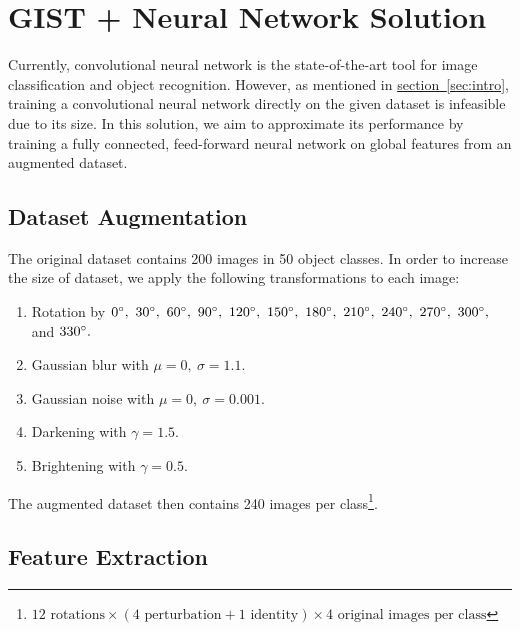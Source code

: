 \documentclass[11pt,a4paper]{article}
\begin{document}
\section{GIST + Neural Network Solution}

Currently, convolutional neural network is the state-of-the-art tool for image classification and object recognition. However, as mentioned in \hyperref[sec:intro]{section~\ref{sec:intro}}, training a convolutional neural network directly on the given dataset is infeasible due to its size. In this solution, we aim to approximate its performance by training a fully connected, feed-forward neural network on global features from an augmented dataset.

\subsection{Dataset Augmentation}

The original dataset contains 200 images in 50 object classes. In order to increase the size of dataset, we apply the following transformations to each image:
\begin{enumerate}[topsep=0.5em, itemsep=-0.5ex]
\item Rotation by $0\degree,\ 30\degree,\ 60\degree,\ 90\degree,\ 120\degree,\ 150\degree,\ 180\degree,\ 210\degree,\ 240\degree,\ 270\degree,\ 300\degree,$ and $330\degree.$
\item Gaussian blur with $\mu=0,\ \sigma=1.1.$
\item Gaussian noise with $\mu=0,\ \sigma=0.001.$
\item Darkening with $\gamma=1.5.$
\item Brightening with $\gamma=0.5.$
\end{enumerate}
The augmented dataset then contains 240 images per class\footnote{$12\text{ rotations}\times(4\text{ perturbation}+1\text{ identity})\times4\text{ original images per class}$}.

\subsection{Feature Extraction}
\end{document}
